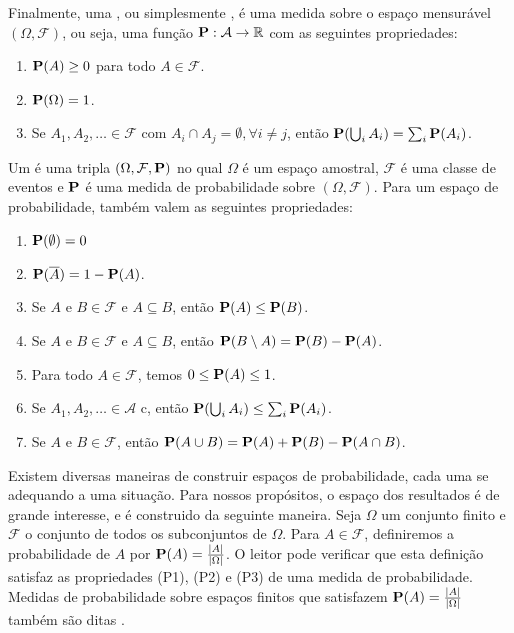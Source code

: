 Finalmente, uma , ou simplesmente , é uma medida sobre o espaço mensurável $(\Omega, \mathcal{F})$, ou seja, uma função $\operatorname{\mathbf{P}} : \mathcal{A} \to \mathbb{R}$ com as seguintes propriedades:

\begin{enumerate}[label=(P\arabic*),itemindent=*]
  \item $\operatorname{\mathbf{P}}(A) \geq 0$ para todo $A \in \mathcal{F}$.
  \item $\operatorname{\mathbf{P}}(\Omega) = 1$.
  \item Se $A_1, A_2, \dots \in \mathcal{F}$ com $A_i \cap A_j = \emptyset, \forall i \neq j$, então $\operatorname{\mathbf{P}}( \bigcup_{i} A_i ) = \sum_i \operatorname{\mathbf{P}}(A_i)$.
\end{enumerate}

Um  é uma tripla $(\Omega, \mathcal{F}, \operatorname{\mathbf{P}})$ no qual $\Omega$ é um espaço amostral, $\mathcal{F}$ é uma classe de eventos e $\operatorname{\mathbf{P}}$ é uma medida de probabilidade sobre $(\Omega, \mathcal{F})$. Para um espaço de probabilidade, também valem as seguintes propriedades:

\begin{enumerate}[label=\arabic*.,itemindent=*]
  \item $\operatorname{\mathbf{P}}(\emptyset) = 0$
  \item $\operatorname{\mathbf{P}}(\overline{A}) = 1 - \operatorname{\mathbf{P}}(A)$.
  \item Se $A$ e $B \in \mathcal{F}$ e $A \subseteq B$, então $\operatorname{\mathbf{P}}(A) \leq \operatorname{\mathbf{P}}(B)$.
  \item Se $A$ e $B \in \mathcal{F}$ e $A \subseteq B$, então $\operatorname{\mathbf{P}}(B \setminus A) = \operatorname{\mathbf{P}}(B) - \operatorname{\mathbf{P}}(A)$.
  \item Para todo $A \in \mathcal{F}$, temos $0 \leq \operatorname{\mathbf{P}}(A) \leq 1$.
  \item Se $A_1, A_2, \dots \in \mathcal{A}$ c, então $\operatorname{\mathbf{P}}( \bigcup_{i} A_i ) \leq \sum_i \operatorname{\mathbf{P}}(A_i)$.
  \item Se $A$ e $B \in \mathcal{F}$, então $\operatorname{\mathbf{P}}(A \cup B) = \operatorname{\mathbf{P}}(A) + \operatorname{\mathbf{P}}(B) - \operatorname{\mathbf{P}}(A \cap B)$.
\end{enumerate}

Existem diversas maneiras de construir espaços de probabilidade, cada uma se adequando a uma situação. Para nossos propósitos, o espaço dos resultados  é de grande interesse, e é construido da seguinte maneira.
Seja $\Omega$ um conjunto finito e $\mathcal{F}$ o conjunto de todos os subconjuntos de $\Omega$. Para $A \in \mathcal{F}$, definiremos a probabilidade de $A$ por $\operatorname{\mathbf{P}}(A) = \frac{\left | A \right |}{\left | \Omega \right |}$. O leitor pode verificar que esta definição satisfaz as propriedades (P1), (P2) e (P3) de uma medida de probabilidade. Medidas de probabilidade sobre espaços finitos que satisfazem $\operatorname{\mathbf{P}}(A) = \frac{\left | A \right |}{\left | \Omega \right |}$ também são ditas .

